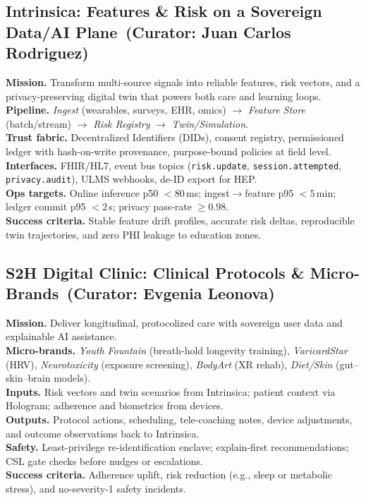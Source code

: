 \documentclass[11pt]{article}
\theoremstyle{plain}
\begin{document}
\subsection{Intrinsica: Features \& Risk on a Sovereign Data/AI Plane \,(Curator: Juan Carlos Rodriguez)}
\textbf{Mission.} Transform multi-source signals into reliable features, risk vectors, and a privacy-preserving digital twin that powers both care and learning loops.\\
\textbf{Pipeline.} \emph{Ingest} (wearables, surveys, EHR, omics) $\rightarrow$ \emph{Feature Store} (batch/stream) $\rightarrow$ \emph{Risk Registry} $\rightarrow$ \emph{Twin/Simulation}.\\
\textbf{Trust fabric.} Decentralized Identifiers (DIDs), consent registry, permissioned ledger with hash-on-write provenance, purpose-bound policies at field level.\\
\textbf{Interfaces.} FHIR/HL7, event bus topics (\texttt{risk.update}, \texttt{session.attempted}, \texttt{privacy.audit}), ULMS webhooks, de-ID export for HEP.\\
\textbf{Ops targets.} Online inference p50 $<80$\,ms; ingest$\rightarrow$feature p95 $<5$\,min; ledger commit p95 $<2$\,s; privacy pass-rate $\ge 0.98$.\\
\textbf{Success criteria.} Stable feature drift profiles, accurate risk deltas, reproducible twin trajectories, and zero PHI leakage to education zones.

\subsection{S2H Digital Clinic: Clinical Protocols \& Micro-Brands \,(Curator: Evgenia Leonova)}
\textbf{Mission.} Deliver longitudinal, protocolized care with sovereign user data and explainable AI assistance.\\
\textbf{Micro-brands.} \emph{Youth Fountain} (breath-hold longevity training), \emph{VaricardStar} (HRV), \emph{Neurotoxicity} (exposure screening), \emph{BodyArt} (XR rehab), \emph{Diet/Skin} (gut–skin–brain models).\\
\textbf{Inputs.} Risk vectors and twin scenarios from Intrinsica; patient context via Hologram; adherence and biometrics from devices.\\
\textbf{Outputs.} Protocol actions, scheduling, tele-coaching notes, device adjustments, and outcome observations back to Intrinsica.\\
\textbf{Safety.} Least-privilege re-identification enclave; explain-first recommendations; CSL gate checks before nudges or escalations.\\
\textbf{Success criteria.} Adherence uplift, risk reduction (e.g., sleep or metabolic stress), and no-severity-1 safety incidents.
\end{document}
